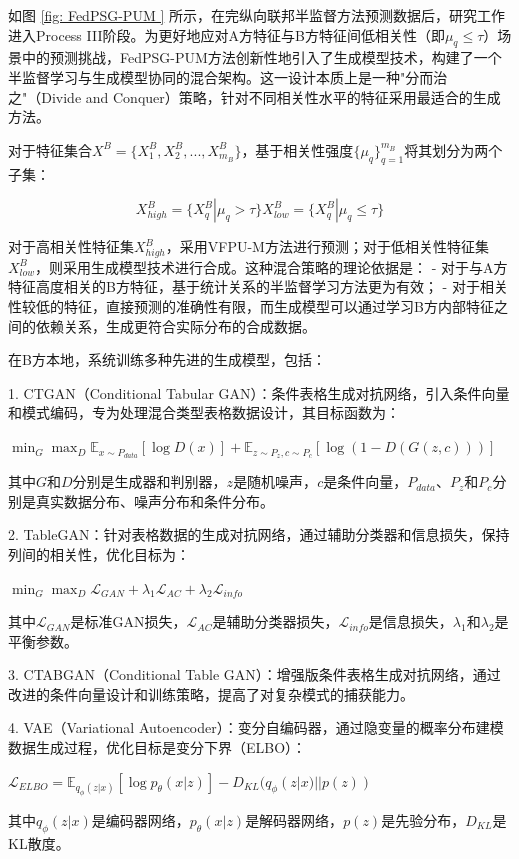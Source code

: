 如图 \ref{fig: FedPSG-PUM } 所示，在完纵向联邦半监督方法预测数据后，研究工作进入Process III阶段。为更好地应对A方特征与B方特征间低相关性（即$\mu_q \leq \tau$）场景中的预测挑战，FedPSG-PUM方法创新性地引入了生成模型技术，构建了一个半监督学习与生成模型协同的混合架构。这一设计本质上是一种"分而治之"（Divide and Conquer）策略，针对不同相关性水平的特征采用最适合的生成方法。

对于特征集合$X^B = \{X^B_1, X^B_2, ..., X^B_{m_B}\}$，基于相关性强度$\{\mu_q\}_{q=1}^{m_B}$将其划分为两个子集：

$$
X^B_{high} = \{X^B_q | \mu_q > \tau\}
X^B_{low} = \{X^B_q | \mu_q \leq \tau\}
$$

对于高相关性特征集$X^B_{high}$，采用VFPU-M方法进行预测；对于低相关性特征集$X^B_{low}$，则采用生成模型技术进行合成。这种混合策略的理论依据是：
- 对于与A方特征高度相关的B方特征，基于统计关系的半监督学习方法更为有效；
- 对于相关性较低的特征，直接预测的准确性有限，而生成模型可以通过学习B方内部特征之间的依赖关系，生成更符合实际分布的合成数据。

在B方本地，系统训练多种先进的生成模型，包括：

1. CTGAN（Conditional Tabular GAN）：条件表格生成对抗网络，引入条件向量和模式编码，专为处理混合类型表格数据设计，其目标函数为：

$\min_G \max_D \mathbb{E}_{x \sim P_{data}}[\log D(x)] + \mathbb{E}_{z \sim P_z, c \sim P_c}[\log(1 - D(G(z, c)))]$

其中$G$和$D$分别是生成器和判别器，$z$是随机噪声，$c$是条件向量，$P_{data}$、$P_z$和$P_c$分别是真实数据分布、噪声分布和条件分布。

2. TableGAN：针对表格数据的生成对抗网络，通过辅助分类器和信息损失，保持列间的相关性，优化目标为：

$\min_G \max_D \mathcal{L}_{GAN} + \lambda_1 \mathcal{L}_{AC} + \lambda_2 \mathcal{L}_{info}$

其中$\mathcal{L}_{GAN}$是标准GAN损失，$\mathcal{L}_{AC}$是辅助分类器损失，$\mathcal{L}_{info}$是信息损失，$\lambda_1$和$\lambda_2$是平衡参数。

3. CTABGAN（Conditional Table GAN）：增强版条件表格生成对抗网络，通过改进的条件向量设计和训练策略，提高了对复杂模式的捕获能力。

4. VAE（Variational Autoencoder）：变分自编码器，通过隐变量的概率分布建模数据生成过程，优化目标是变分下界（ELBO）：

$\mathcal{L}_{ELBO} = \mathbb{E}_{q_\phi(z|x)}[\log p_\theta(x|z)] - D_{KL}(q_\phi(z|x) || p(z))$

其中$q_\phi(z|x)$是编码器网络，$p_\theta(x|z)$是解码器网络，$p(z)$是先验分布，$D_{KL}$是KL散度。

